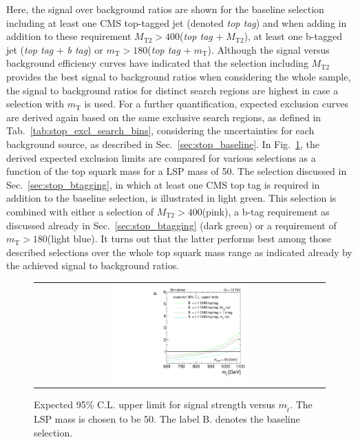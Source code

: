 Here, the signal over background ratios are shown for the baseline selection including at least one CMS top-tagged jet (denoted \textit{top tag}) and when adding in addition to these requirement $M_\mathrm{T2} > 400$\gev (\textit{top tag} $+ \; M_\mathrm{T2}$), at least one b-tagged jet (\textit{top tag} + \textit{b tag}) or $m_\mathrm{T} > 180$\gev (\textit{top tag} $+ \; m_\mathrm{T}$). Although the signal versus background efficiency curves have indicated that the selection including $M_\mathrm{T2}$ provides the best signal to background ratios when considering the whole sample, the signal to background ratios for distinct search regions are highest in case a selection with $m_\mathrm{T}$ is used. For a further quantification, expected exclusion curves are derived again based on the same exclusive search regions, as defined in Tab.~\ref{tab:stop_excl_search_bins}, considering the uncertainties for each background source, as described in Sec.~\ref{sec:stop_baseline}. In Fig.~\ref{fig:stop_baselinetoptag_limit}, the derived expected exclusion limits are compared for various selections as a function of the top squark mass for a LSP mass of 50\gev. The selection discussed in Sec.~\ref{sec:stop_btagging}, in which at least one CMS top tag is required in addition to the baseline selection, is illustrated in light green. This selection is combined with either a selection of $M_\mathrm{T2} > 400$\gev (pink), a b-tag requirement as discussed already in Sec.~\ref{sec:stop_btagging} (dark green) or a requirement of $m_\mathrm{T} > 180$\gev (light blue). It turns out that the latter performs best among those described selections over the whole top squark mass range as indicated already by the achieved signal to background ratios. 
\begin{figure}[!h]
  \centering
  \begin{tabular}{c}
                \includegraphics[width=0.49\textwidth]{figures/limitplot4BinSel_BaselineBTagTopTagTransverseMassMT2_LSP50.pdf} 
  \end{tabular}
  \caption{Expected 95\% C.L. upper limit for signal strength versus $m_{\tilde{t}}$. The LSP mass is chosen to be 50\gev. The label B. denotes the baseline selection.}
  \label{fig:stop_baselinetoptag_limit}
\end{figure}

